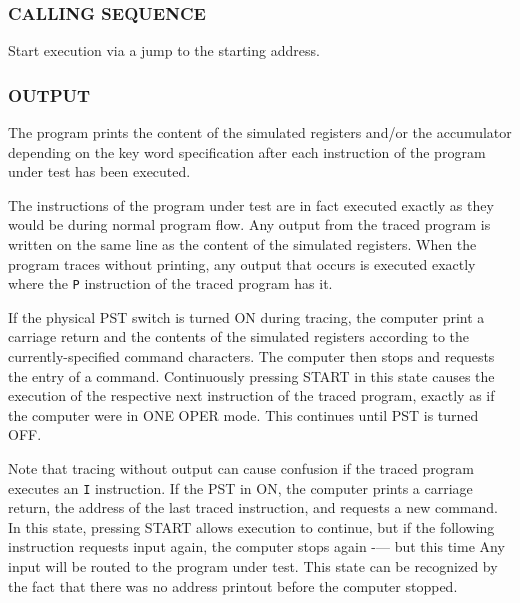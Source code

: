\subsubsection*{CALLING SEQUENCE}
Start execution via a jump to the starting address.

\subsubsection*{OUTPUT}
The program prints the content of the simulated registers and/or the accumulator depending on the key word specification after each instruction of the program under test has been executed.

The instructions of the program under test are in fact executed exactly as they would be during normal program flow. Any output from the traced program is written on the same line as the content of the simulated registers. When the program traces without printing, any output that occurs is executed exactly where the \texttt{P} instruction of the traced program has it.

If the physical \textsf{PST} switch is turned \textsf{ON} during tracing, the computer print a carriage return and the contents of the simulated registers according to the currently-specified command characters. The computer then stops and requests the entry of a command. Continuously pressing \textsf{START} in this state causes the execution of the respective next instruction of the traced program, exactly as if the computer were in \textsf{ONE OPER} mode. This continues until \textsf{PST} is turned \textsf{OFF}.

Note that tracing without output can cause confusion if the traced program executes an \texttt{I} instruction. If the \textsf{PST} in \textsf{ON}, the computer prints a carriage return, the address of the last traced instruction, and requests a new command. In this state, pressing \textsf{START} allows execution to continue, but if the following instruction requests input again, the computer stops again -— but this time Any input will be routed to the program under test. This state can be recognized by the fact that there was no address printout before the computer stopped.

